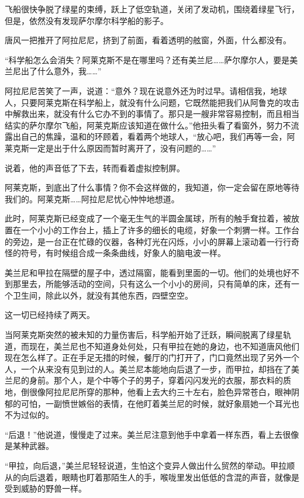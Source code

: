 飞船很快争脱了绿星的束缚，跃上了低空轨道，关闭了发动机，围绕着绿星飞行，但是，依然没有发现萨尔摩尔科学船的影子。 

唐风一把推开了阿拉尼尼，挤到了前面，看着透明的舷窗，外面，什么都没有。 

“科学船怎么会消失？阿莱克斯不是在哪里吗？还有美兰尼……萨尔摩尔人，要是美兰尼出了什么意外，我……” 

阿拉尼尼苦笑了一声，说道：“意外？现在说意外还为时过早。请相信我，地球人，只要阿莱克斯在科学船上，就没有什么问题，它既然能把我们从阿鲁克的攻击中解救出来，就没有什么它办不到的事情了。那只是一艘非常容易控制，而且相当结实的萨尔摩尔飞船，阿莱克斯应该知道在做什么。”他扭头看了看窗外，努力不流露出自己的焦躁，温和的环顾着，看着两个地球人，“放心吧，我们再等一会，阿莱克斯一定是出于什么原因而暂时离开了，没有问题的……” 

说着，他的声音低了下去，转而看着虚拟控制屏。 

阿莱克斯，到底出了什么事情？你不会这样做的，我知道，你一定会留在原地等待我们的。阿莱克斯……阿拉尼尼忧心忡忡地想道。 

此时，阿莱克斯已经变成了一个毫无生气的半圆金属球，所有的触手耷拉着，被放置在一个小小的工作台上，插上了许多的细长的电缆，好象一个刺猬一样。工作台的旁边，是一台正在忙碌的仪器，各种灯光在闪烁，小小的屏幕上滚动着一行行奇怪的符号，有时候组合成一条条曲线，好象人的脑电波一样。 

美兰尼和甲拉在隔壁的屋子中，透过隔窗，能看到里面的一切。他们的处境也好不到那里去，所能够活动的空间，只有这么一个小小的房间，只有简单的床，还有一个卫生间，除此以外，就没有其他东西，四壁空空。 

这一切已经持续了两天。 

当阿莱克斯突然的被未知的力量伤害后，科学船开始了迁跃，瞬间脱离了绿星轨道，而现在，美兰尼也不知道身处何处，只有甲拉在她的身边，也不知道唐风他们现在怎么样了。正在手足无措的时候，餐厅的门打开了，门口竟然出现了另外一个人，一个从来没有见到过的人。美兰尼本能地向后退了一步，而甲拉，却挡在了美兰尼的身前。那个人，是个中等个子的男子，穿着闪闪发光的衣服，那衣料的质地，倒很像阿拉尼尼所穿的那种，他看上去大约三十左右，脸色异常苍白，眼神阴郁的可怕，一副愤世嫉俗的表情，在他盯着美兰尼的时候，就好象扇她一个耳光也不为过似的。 

“后退！”他说道，慢慢走了过来。美兰尼注意到他手中拿着一样东西，看上去很像是某种武器。 

“甲拉，向后退，”美兰尼轻轻说道，生怕这个变异人做出什么贸然的举动。甲拉顺从的向后退着，眼睛也盯着那陌生人的手，喉咙里发出低低的含混的声音，就像是受到威胁的野兽一样。 

